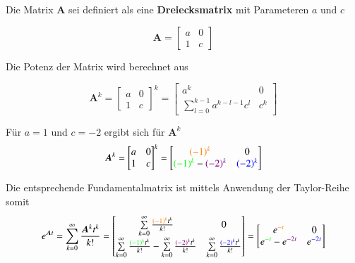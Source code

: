 
\begin{minipage}[c]{0.6\columnwidth}
    Die Matrix $\bm{A}$ sei definiert als eine \textbf{Dreiecksmatrix} mit Parameteren $a$ und $c$
\end{minipage}
\hfill
\begin{minipage}[c]{0.38\columnwidth}
    $$ \bm{A} = \begin{bmatrix*} a & 0 \\ 1 & c \end{bmatrix*} $$
\end{minipage}


\begin{minipage}[c]{0.5\columnwidth}
    Die Potenz der Matrix wird berechnet aus
\end{minipage}
\hfill
\begin{minipage}[c]{0.48\columnwidth}
    $$ \bm{A}^k = \begin{bmatrix*} a & 0 \\ 1 & c \end{bmatrix*}^k 
    = \begin{bmatrix*} a^k & 0 \\ \sum\limits_{l=0}^{k-1} a^{k-l-1} c^l  & c^k \end{bmatrix*} $$
\end{minipage}


Für $a = 1$ und $c=-2$ ergibt sich für $\bm{A}^k$
$$ \bm{A}^k = \begin{bmatrix*} a & 0 \\ 1 & c \end{bmatrix*}^k 
    = \begin{bmatrix*} \cor{(-1)^k} & 0 \\ \cgn{(-1)^k} - \cvt{(-2)^k} & \cbl{(-2)^k} \end{bmatrix*} $$

Die entsprechende Fundamentalmatrix ist mittels Anwendung der Taylor-Reihe somit
$$ e^{\bm{A} t} = \sum\limits_{k=0}^{\infty} \frac{\bm{A}^k t^k}{k!} =
    \begin{bmatrix*} \sum\limits_{k=0}^{\infty} \frac{\cor{(-1)^k}t^k}{k!} & 0 \\ 
    \sum\limits_{k=0}^{\infty} \frac{\cgn{(-1)^k}t^k}{k!} - \sum\limits_{k=0}^{\infty} \frac{\cvt{(-2)^k}t^k}{k!} 
    & \sum\limits_{k=0}^{\infty} \frac{\cbl{(-2)^k}t^k}{k!} \end{bmatrix*} 
    = \begin{bmatrix*} e^{\cor{-t}} & 0 \\ e^{\cgn{-t}} - e^{\cvt{-2t}} & e^{\cbl{-2t}} \end{bmatrix*} $$


